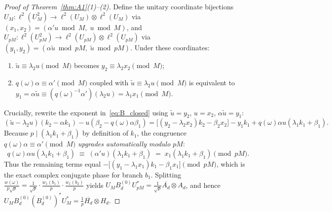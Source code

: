 \documentclass[11pt,a4paper]{article}
\numberwithin{equation}{section}
\theoremstyle{definition}
\theoremstyle{remark}
\begin{document}
\begin{proof}[Proof of Theorem~\ref{thm:A1}(1)--(2)]
Define the unitary coordinate bijections $U_M : \ell^2(U_M^2) \to \ell^2(U_M)\otimes\ell^2(U_M)$ via $(x_1, x_2) = (\alpha' u \bmod M,\; u \bmod M)$, and $U_{pM} : \ell^2(U_{pM}^2) \to \ell^2(U_{pM})\otimes\ell^2(U_{pM})$ via $(y_1, y_2) = (\alpha \tilde u \bmod pM,\; \tilde u \bmod pM)$. Under these coordinates:
\begin{enumerate}[label=(\roman*)]
\item $\tilde u \equiv \lambda_2 u \pmod M$ becomes $y_2 \equiv \lambda_2 x_2 \pmod M$;
\item $q(\omega)\alpha \equiv \alpha' \pmod M$ coupled with $\tilde u \equiv \lambda_2 u \pmod M$ is equivalent to $y_1 = \alpha \tilde u \equiv (q(\omega)^{-1}\alpha')(\lambda_2 u) = \lambda_1 x_1 \pmod M$.
\end{enumerate}
Crucially, rewrite the exponent in~\eqref{eq:B_closed} using $\tilde u = y_2$, $u = x_2$, $\alpha \tilde u = y_1$:
\[
(\tilde u - \lambda_2 u)(k_2 - \alpha k_1) - u(\beta_2 - q(\omega)\alpha\beta_1) = \bigl[(y_2 - \lambda_2 x_2)k_2 - \beta_2 x_2\bigr] - y_1 k_1 + q(\omega)\alpha u(\lambda_1 k_1 + \beta_1).
\]
Because $p \mid (\lambda_1 k_1 + \beta_1)$ by definition of $k_1$, the congruence $q(\omega)\alpha \equiv \alpha' \pmod M$ \emph{upgrades automatically modulo $pM$}:
\[
q(\omega)\alpha u(\lambda_1 k_1 + \beta_1) \;\equiv\; (\alpha' u)(\lambda_1 k_1 + \beta_1) \;=\; x_1(\lambda_1 k_1 + \beta_1) \pmod{pM}.
\]
Thus the remaining terms equal $-\bigl[(y_1 - \lambda_1 x_1)k_1 - \beta_1 x_1\bigr] \pmod{pM}$, which is the exact complex conjugate phase for branch $b_1$. Splitting $\frac{w(\omega)}{p\sqrt{p}} = \frac{1}{\sqrt{p}}\cdot\frac{w_1(b_1)}{p}\cdot\frac{w_1(b_2)}{p}$ yields $U_M B_d^{(0)} U_{pM}^* = \frac{1}{\sqrt{p}}\overline{A_d}\otimes A_d$, and hence $U_M B_d^{(0)}(B_d^{(0)})^* U_M^* = \frac{1}{p}\overline{H_d}\otimes H_d$.


\end{proof}
\end{document}
